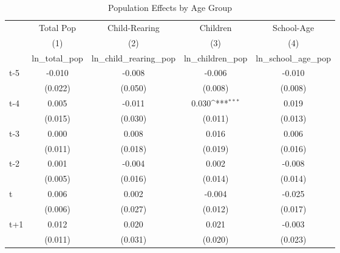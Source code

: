 \begin{table}[htbp]\centering
\def\sym#1{\ifmmode^{#1}\else\(^{#1}\)\fi}
\caption{Population Effects by Age Group}
\begin{tabular}{l*{4}{c}}
\hline\hline
            &\multicolumn{1}{c}{Total Pop}&\multicolumn{1}{c}{Child-Rearing}&\multicolumn{1}{c}{Children}&\multicolumn{1}{c}{School-Age}\\\cmidrule(lr){2-2}\cmidrule(lr){3-3}\cmidrule(lr){4-4}\cmidrule(lr){5-5}
            &\multicolumn{1}{c}{(1)}&\multicolumn{1}{c}{(2)}&\multicolumn{1}{c}{(3)}&\multicolumn{1}{c}{(4)}\\
            &\multicolumn{1}{c}{ln\_total\_pop}&\multicolumn{1}{c}{ln\_child\_rearing\_pop}&\multicolumn{1}{c}{ln\_children\_pop}&\multicolumn{1}{c}{ln\_school\_age\_pop}\\
\hline
t-5         &      -0.010         &      -0.008         &      -0.006         &      -0.010         \\
            &     (0.022)         &     (0.050)         &     (0.008)         &     (0.008)         \\
[1em]
t-4         &       0.005         &      -0.011         &       0.030\sym{***}&       0.019         \\
            &     (0.015)         &     (0.030)         &     (0.011)         &     (0.013)         \\
[1em]
t-3         &       0.000         &       0.008         &       0.016         &       0.006         \\
            &     (0.011)         &     (0.018)         &     (0.019)         &     (0.016)         \\
[1em]
t-2         &       0.001         &      -0.004         &       0.002         &      -0.008         \\
            &     (0.005)         &     (0.016)         &     (0.014)         &     (0.014)         \\
[1em]
t           &       0.006         &       0.002         &      -0.004         &      -0.025         \\
            &     (0.006)         &     (0.027)         &     (0.012)         &     (0.017)         \\
[1em]
t+1         &       0.012         &       0.020         &       0.021         &      -0.003         \\
            &     (0.011)         &     (0.031)         &     (0.020)         &     (0.023)         \\

\end{tabular}
\end{table}
